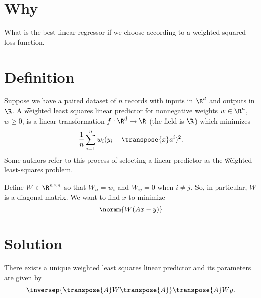 
\section*{Why}

What is the best linear regressor if we choose according to a weighted squared loss function.

\section*{Definition}

Suppose we have a paired dataset of $n$ records with inputs in $\R ^d$ and outputs in $\R $.
A \t{weighted least squares linear predictor} for nonnegative weights $w \in \R ^n$, $w \geq 0$, is a linear transformation $f: \R ^d \to \R $ (the field is $\R $) which minimizes
  \[
\frac{1}{n} \sum_{i = 1}^{n} w_i(y_i - \transpose{x}a^i)^2.
  \]
Some authors refer to this process of selecting a linear predictor as the \t{weighted least-squares problem}.

Define $W \in \R ^{n \times n}$ so that $W_{ii} = w_i$ and $W_{ij} = 0$ when $i \neq j$.
So, in particular, $W$ is a diagonal matrix.
We want to find $x$ to minimize
  \[
\normm{W(Ax - y)}
  \]

\section*{Solution}

\begin{proposition}There exists a unique weighted least squares linear predictor and its parameters are given by
\[
\inversep{\transpose{A}W\transpose{A}}\transpose{A}Wy.
\]
\end{proposition}
\blankpage